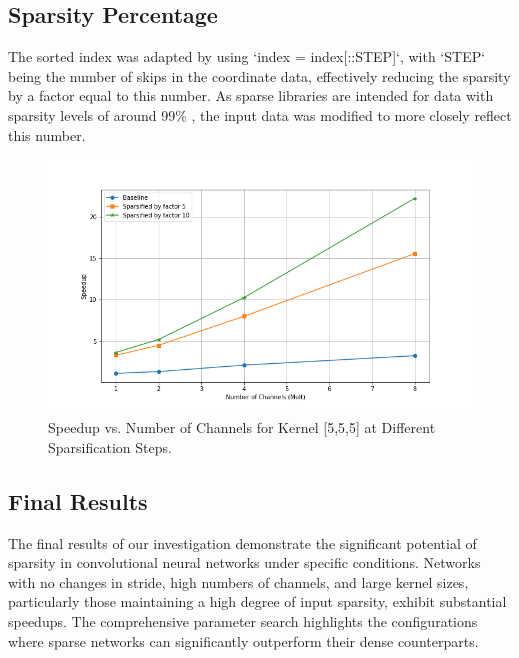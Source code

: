 \documentclass{article}
\begin{document}
\subsection{Sparsity Percentage}
\label{sparsity_percentage}
The sorted index was adapted by using `index = index[::STEP]`, with `STEP` being the number of skips in the coordinate data, effectively reducing the sparsity by a factor equal to this number. As sparse libraries are intended for data with sparsity levels of around 99\% \cite{yang2023minuet}, the input data was modified to more closely reflect this number.

\begin{figure}[h!]
    \centering
    \includegraphics[width=\linewidth]{figures/Plots/speedup_var_sparsity_555+(1,1,1).png}
    \caption{Speedup vs. Number of Channels for Kernel [5,5,5] at Different Sparsification Steps.}
    \label{fig:speedup_var_sparsity}
\end{figure}

\subsection{Final Results}
\label{final_results}
The final results of our investigation demonstrate the significant potential of sparsity in convolutional neural networks under specific conditions. Networks with no changes in stride, high numbers of channels, and large kernel sizes, particularly those maintaining a high degree of input sparsity, exhibit substantial speedups. The comprehensive parameter search highlights the configurations where sparse networks can significantly outperform their dense counterparts.
\end{document}

